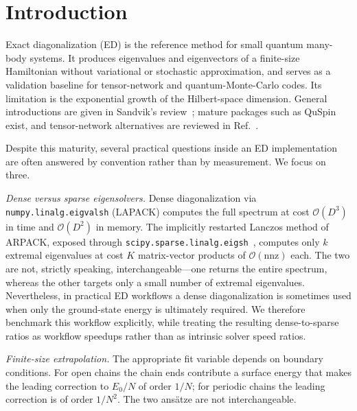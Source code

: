 \documentclass[pdflatex,sn-mathphys-num]{sn-jnl}
\begin{document}
\maketitle

\section{Introduction}
\label{sec:intro}

Exact diagonalization (ED) is the reference method for small quantum
many-body systems. It produces eigenvalues and eigenvectors of a
finite-size Hamiltonian without variational or stochastic
approximation, and serves as a validation baseline for tensor-network
and quantum-Monte-Carlo codes. Its limitation is the exponential
growth of the Hilbert-space dimension. General introductions are
given in Sandvik's review~\cite{Sandvik2010}; mature packages such as
QuSpin~\cite{Weinberg2017} exist, and tensor-network alternatives are
reviewed in Ref.~\cite{Schollwock2011}.

Despite this maturity, several practical questions inside an ED
implementation are often answered by convention rather than by
measurement. We focus on three.

\emph{Dense versus sparse eigensolvers.} Dense diagonalization via
\texttt{numpy.linalg.eigvalsh} (LAPACK) computes the full spectrum at
cost $\mathcal{O}(D^3)$ in time and $\mathcal{O}(D^2)$ in memory. The
implicitly restarted Lanczos method of ARPACK, exposed through
\texttt{scipy.sparse.linalg.eigsh}~\cite{Lehoucq1998}, computes only
$k$ extremal eigenvalues at cost $K$ matrix-vector products of
$\mathcal{O}(\mathrm{nnz})$ each. The two are not, strictly speaking,
interchangeable---one returns the entire spectrum, whereas the other
targets only a small number of extremal eigenvalues. Nevertheless,
in practical ED workflows a dense diagonalization is sometimes used
when only the ground-state energy is ultimately required. We
therefore benchmark this workflow explicitly, while treating the
resulting dense-to-sparse ratios as workflow speedups rather than as
intrinsic solver speed ratios.

\emph{Finite-size extrapolation.} The appropriate fit variable
depends on boundary conditions. For open chains the chain ends
contribute a surface energy that makes the leading correction to
$E_0/N$ of order $1/N$; for periodic chains the leading correction is
of order $1/N^{2}$. The two ans\"atze are not interchangeable.
\end{document}
